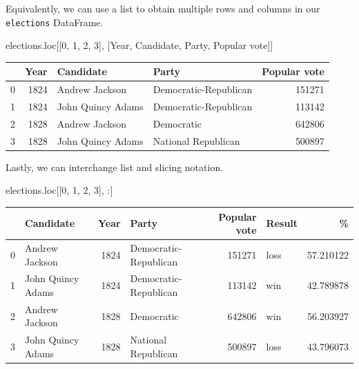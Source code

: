 \documentclass[
  letterpaper,
  DIV=11,
  numbers=noendperiod]{scrreprt}
\newenvironment{Shaded}{\begin{snugshade}}{\end{snugshade}}
\newcommand{\DecValTok}[1]{\textcolor[rgb]{0.68,0.00,0.00}{#1}}
\newcommand{\NormalTok}[1]{\textcolor[rgb]{0.00,0.23,0.31}{#1}}
\newcommand{\StringTok}[1]{\textcolor[rgb]{0.13,0.47,0.30}{#1}}
\begin{document}
Equivalently, we can use a list to obtain multiple rows and columns in
our \texttt{elections} DataFrame.

\begin{Shaded}
\begin{Highlighting}[]
\NormalTok{elections.loc[[}\DecValTok{0}\NormalTok{, }\DecValTok{1}\NormalTok{, }\DecValTok{2}\NormalTok{, }\DecValTok{3}\NormalTok{], [}\StringTok{\textquotesingle{}Year\textquotesingle{}}\NormalTok{, }\StringTok{\textquotesingle{}Candidate\textquotesingle{}}\NormalTok{, }\StringTok{\textquotesingle{}Party\textquotesingle{}}\NormalTok{, }\StringTok{\textquotesingle{}Popular vote\textquotesingle{}}\NormalTok{]]}
\end{Highlighting}
\end{Shaded}

\begin{tabular}{lrllr}
\toprule
{} &  Year &          Candidate &                  Party &  Popular vote \\
\midrule
0 &  1824 &     Andrew Jackson &  Democratic-Republican &        151271 \\
1 &  1824 &  John Quincy Adams &  Democratic-Republican &        113142 \\
2 &  1828 &     Andrew Jackson &             Democratic &        642806 \\
3 &  1828 &  John Quincy Adams &    National Republican &        500897 \\
\bottomrule
\end{tabular}

Lastly, we can interchange list and slicing notation.

\begin{Shaded}
\begin{Highlighting}[]
\NormalTok{elections.loc[[}\DecValTok{0}\NormalTok{, }\DecValTok{1}\NormalTok{, }\DecValTok{2}\NormalTok{, }\DecValTok{3}\NormalTok{], :]}
\end{Highlighting}
\end{Shaded}

\begin{tabular}{llrlrlr}
\toprule
{} &          Candidate &  Year &                  Party &  Popular vote & Result &          \% \\
\midrule
0 &     Andrew Jackson &  1824 &  Democratic-Republican &        151271 &   loss &  57.210122 \\
1 &  John Quincy Adams &  1824 &  Democratic-Republican &        113142 &    win &  42.789878 \\
2 &     Andrew Jackson &  1828 &             Democratic &        642806 &    win &  56.203927 \\
3 &  John Quincy Adams &  1828 &    National Republican &        500897 &   loss &  43.796073 \\
\bottomrule
\end{tabular}
\end{document}
